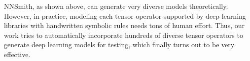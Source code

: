 \begin{survey}
NNSmith, as shown above, can generate very diverse models theoretically. However, in practice, modeling each tensor operator supported by deep learning libraries with handwritten symbolic rules needs tons of human effort. Thus, our work tries to automatically incorporate hundreds of diverse tensor operators to generate deep learning models for testing, which finally turns out to be very effective.





\end{survey}

